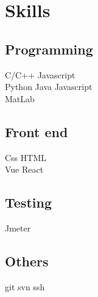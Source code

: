 \documentclass[]{deedy-resume-openfont}
\begin{document}
\begin{minipage}[t]{0.3\textwidth}
\section{Skills}
\sectionsep
\subsection{Programming}
C/C++ \textbullet{} Javascript \\
Python \textbullet{} Java \textbullet{} Javascript \\
MatLab \textbullet{} \\ 
\sectionsep

\subsection{Front end}
Css \textbullet{} HTML \textbullet{} \\
Vue \textbullet{} React \textbullet{}\\
\sectionsep

\subsection{Testing}
Jmeter  \\
\sectionsep

\subsection{Others}
git \textbullet svn \textbullet ssh \\

%
%

\end{minipage} 
\hfill
\end{document}
